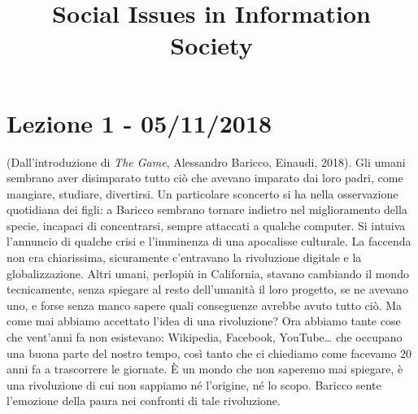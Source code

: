\documentclass[a4page, 11pt]{article}
\title{\textbf{Social Issues in Information Society}}
\author{}
\date{}
\begin{document}
\maketitle


\section*{Lezione 1 - 05/11/2018}
(Dall'introduzione di \textit{The Game}, Alessandro Baricco, Einaudi, 2018). \newline
Gli umani sembrano aver disimparato tutto ciò che avevano imparato dai loro padri, come mangiare, studiare, divertirsi.
Un particolare sconcerto si ha nella osservazione quotidiana dei figli: a Baricco sembrano tornare indietro nel miglioramento della specie, incapaci di concentrarsi, sempre attaccati a qualche computer.
Si intuiva l'annuncio di qualche crisi e l'imminenza di una apocalisse culturale.
La faccenda non era chiarissima, sicuramente c'entravano la rivoluzione digitale e la globalizzazione.
Altri umani, perlopiù in California, stavano cambiando il mondo tecnicamente, senza spiegare al resto dell'umanità il loro progetto, se ne avevano uno, e forse senza manco sapere quali conseguenze avrebbe avuto tutto ciò.
Ma come mai abbiamo accettato l'idea di una rivoluzione?
Ora abbiamo tante cose che vent'anni fa non esistevano: Wikipedia, Facebook, YouTube\ldots{} che occupano una buona parte del nostro tempo, così tanto che ci chiediamo come facevamo 20 anni fa a trascorrere le giornate.
È un mondo che non saperemo mai spiegare, è una rivoluzione di cui non sappiamo né l'origine, né lo scopo.
Baricco sente l'emozione della paura nei confronti di tale rivoluzione. \newline
\end{document}
